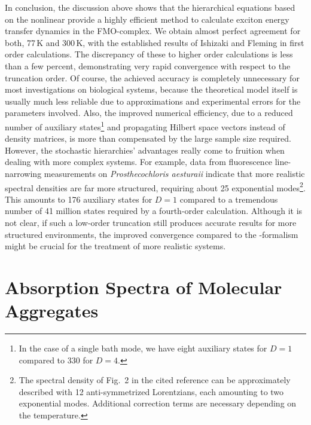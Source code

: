 In conclusion, the discussion above shows that the hierarchical equations based on the nonlinear \NMSSE provide a highly efficient method to calculate exciton energy transfer dynamics in the FMO-complex.
We obtain almost perfect agreement for both, 77\,K and 300\,K, with the established results of Ishizaki and Fleming in first order calculations.
The discrepancy of these to higher order calculations is less than a few percent, demonstrating very rapid convergence with respect to the truncation order.
Of course, the achieved accuracy is completely unnecessary for most investigations on biological systems, because the theoretical model itself is usually much less reliable due to approximations and experimental errors for the parameters involved.
Also, the improved numerical efficiency, due to a reduced number of auxiliary states\footnote{%
  In the case of a single bath mode, we have eight auxiliary states for $D=1$ compared to 330 for $D=4$.
}
and propagating Hilbert space vectors instead of density matrices, is more than compensated by the large sample size required.
However, the stochastic hierarchies' advantages really come to fruition when dealing with more complex systems.
For example, data from fluorescence line-narrowing measurements on \emph{Prosthecochloris aesturaii} indicate \cite{AdRe06_fmo} that more realistic spectral densities are far more structured, requiring about 25 exponential modes\footnote{%
  The spectral density of Fig.~2 in the cited reference can be approximately described with 12 anti-symmetrized Lorentzians, each amounting to two exponential modes.
  Additional correction terms are necessary depending on the temperature.
}.
This amounts to 176 auxiliary states for $D=1$ compared to a tremendous number of 41 million states required by a fourth-order calculation.
Although it is not clear, if such a low-order truncation still produces accurate results for more structured environments, the improved convergence compared to the \HEOM-formalism might be crucial for the treatment of more realistic systems.


\section{Absorption Spectra of Molecular Aggregates}
\label{sec:app.spectra}

